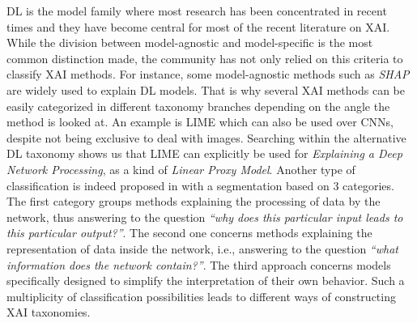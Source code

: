 \documentclass[final]{elsarticle}
\begin{document}
DL is the model family where most research has been concentrated in recent times and they have become central for most of the recent literature on XAI. While the division between model-agnostic and model-specific is the most common distinction made, the community has not only relied on this criteria to classify XAI methods. For instance, some model-agnostic methods such as \textit{SHAP} \cite{lundberg2017unified} are widely used to explain DL models. That is why several XAI methods can be easily categorized in different taxonomy branches depending on the angle the method is looked at. An example is LIME which can also be used over CNNs, despite not being exclusive to deal with images. Searching within the alternative DL taxonomy shows us that LIME can explicitly be used for \textit{Explaining a Deep Network Processing}, as a kind of \textit{Linear Proxy Model}. Another type of classification is indeed proposed in \cite{Gilpin18} with a segmentation based on 3 categories. The first category groups methods explaining the processing of data by the network, thus answering to the question \emph{``why does this particular input leads to this particular output?''}. The second one concerns methods explaining the representation of data inside the network, i.e., answering to the question \emph{``what information does the network contain?''}. The third approach concerns models specifically designed to simplify the interpretation of their own behavior. Such a multiplicity of classification possibilities leads to different ways of constructing XAI taxonomies.
\end{document}
